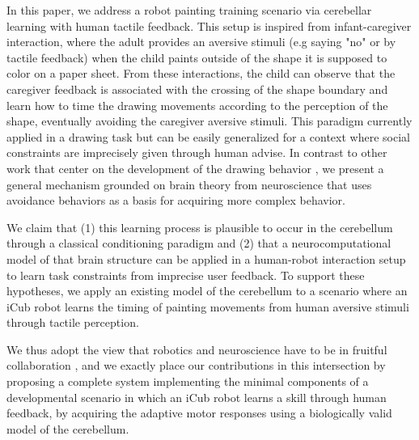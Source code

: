 \documentclass[letterpaper, 10 pt, conference]{ieeeconf}  %
\newcommand\jp[1]{{\color{red}}{\color{red}}{\footnotesize \color{red}[#1 - \textbf{Jordi}]}} %
\begin{document}
In this paper, we address a robot painting training scenario via cerebellar learning with human tactile feedback. This setup is inspired from infant-caregiver interaction, where the adult provides an aversive stimuli (e.g saying "no" or by tactile feedback) when the child paints outside of the shape it is supposed to color on a paper sheet. From these interactions, the child can observe that the caregiver feedback is associated with the crossing of the shape boundary and learn how to time the drawing movements according to the perception of the shape, eventually avoiding the caregiver aversive stimuli. This paradigm currently applied in a drawing task but can be easily generalized for a context where social constraints are imprecisely given through human advise. In contrast to other work that center on the development of the drawing behavior \cite{kudoh2006,nishide2015}, we present a general mechanism grounded on brain theory from neuroscience that uses avoidance behaviors as a basis for acquiring more complex behavior. 

We claim that (1) this learning process is plausible to occur in the cerebellum through a classical conditioning paradigm and (2) that a neurocomputational model of that brain structure can be applied in a human-robot interaction setup to learn task constraints from imprecise user feedback. To support these hypotheses, we apply an existing model of the  cerebellum  \cite{herreros2013nucleo} to a scenario where an iCub robot \cite{metta2008icub} learns the timing of painting movements from human aversive stimuli through tactile perception. %

We thus adopt the view that robotics and neuroscience have to be in fruitful collaboration \cite{floreano2014robotics}, and we exactly place our contributions in this intersection by proposing a complete system implementing the minimal components of a developmental scenario in which an iCub robot learns a skill through human feedback, by acquiring the adaptive motor responses using a biologically valid model of the cerebellum.
\end{document}

